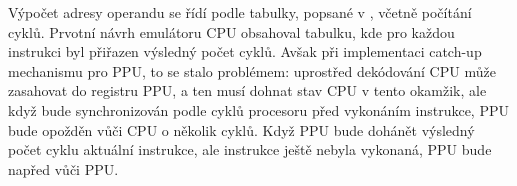 Výpočet adresy operandu se řídí podle tabulky, popsané v \cite{6502-datasheet}, včetně počítání
cyklů. Prvotní návrh emulátoru CPU obsahoval tabulku, kde pro každou instrukci byl přiřazen výsledný
počet cyklů. Avšak při implementaci catch-up mechanismu pro PPU, to se stalo problémem: uprostřed
dekódování CPU může zasahovat do registru PPU, a ten musí dohnat stav CPU v tento okamžik, ale když
bude synchronizován podle cyklů procesoru před vykonáním instrukce, PPU bude opožděn vůči CPU o
několik cyklů. Když PPU bude dohánět výsledný počet cyklu aktuální instrukce, ale instrukce ještě
nebyla vykonaná, PPU bude napřed vůči PPU.

